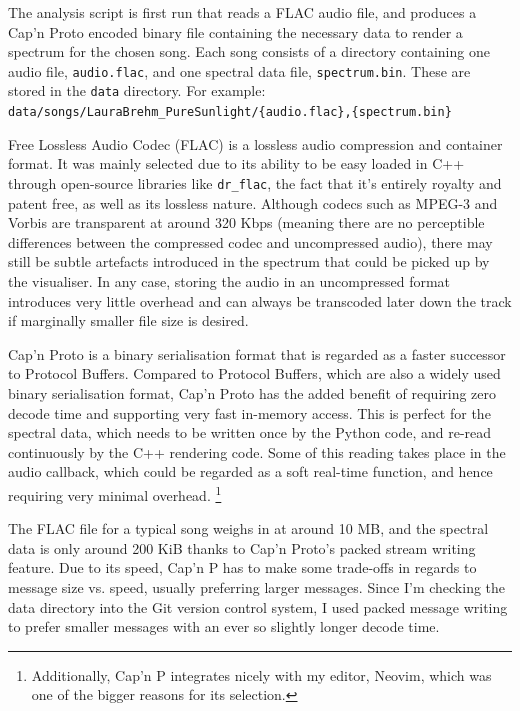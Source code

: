 \documentclass[11pt]{article}
\begin{document}
The analysis script is first run that reads a FLAC \cite{xiphFLACWhat} audio file, and produces a Cap'n Proto
\cite{capnp} encoded binary file containing the necessary data to render a spectrum for the chosen song. Each
song consists of a directory containing one audio file, \verb|audio.flac|, and one spectral data file,
\verb|spectrum.bin|. These are stored in the \verb|data| directory. For example: \\
\verb|data/songs/LauraBrehm_PureSunlight/{audio.flac},{spectrum.bin}|

Free Lossless Audio Codec (FLAC) \cite{xiphFLACWhat} is a lossless audio compression and container format. It was mainly selected
due to its ability to be easy loaded in C++ through open-source libraries like \verb|dr_flac|, the fact that
it's entirely royalty and patent free, as well as its lossless nature. Although codecs such as MPEG-3 and
Vorbis are transparent at around 320 Kbps (meaning there are no perceptible differences between the compressed
codec and uncompressed audio), there may still be subtle artefacts introduced in the spectrum that could be
picked up by the visualiser. In any case, storing the audio in an uncompressed format introduces very little
overhead and can always be transcoded later down the track if marginally smaller file size is desired.

Cap'n Proto \cite{capnp} is a binary serialisation format that is regarded as a faster successor to Protocol Buffers.
Compared to Protocol Buffers, which are also a widely used binary serialisation format, Cap'n Proto has the
added benefit of requiring zero decode time and supporting very fast in-memory access. This is perfect for the
spectral data, which needs to be written once by the Python code, and re-read continuously by the C++
rendering code. Some of this reading takes place in the audio callback, which could be regarded as a soft
real-time function, and hence requiring very minimal overhead.
\footnote{Additionally, Cap'n P integrates nicely with my editor, Neovim, which was one of the bigger reasons
for its selection.}

The FLAC file for a typical song weighs in at around 10 MB, and the spectral data is only around 200 KiB
thanks to Cap'n Proto's packed stream writing feature. Due to its speed, Cap'n P has to make some
trade-offs in regards to message size vs. speed, usually preferring larger messages. Since I'm checking the
data directory into the Git version control system, I used packed message writing to prefer smaller messages
with an ever so slightly longer decode time.
\end{document}
